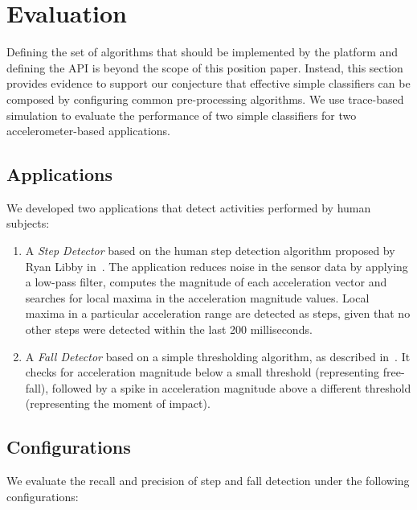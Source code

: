 \section{Evaluation}
\label{sec:validation}

Defining the set of algorithms that should be implemented by the
platform and defining the API is beyond the scope of this position
paper.  Instead, this section provides evidence to support our
conjecture that effective simple classifiers can be composed by
configuring common pre-processing algorithms.  We use trace-based
simulation to evaluate the performance of two simple classifiers for
two accelerometer-based applications.

\newpage
\subsection{Applications}

We developed two applications that detect activities performed by 
human subjects:

\begin{enumerate}
\setlength{\itemsep}{-3pt}  

\item A {\em Step Detector} based on the human step detection algorithm
  proposed by Ryan Libby in~\cite{libbyFootstepDetection}. The
  application reduces noise in the sensor data by applying a low-pass 
  filter, computes the magnitude of each acceleration vector and searches 
  for local maxima in the acceleration magnitude values. Local maxima
  in a particular acceleration range are detected as steps, given
  that no other steps were detected within the last 200 milliseconds.

\item A {\em Fall Detector} based on a simple thresholding algorithm,
  as described in~\cite{kangasFallDetection}.  It checks for acceleration magnitude 
  below a small threshold (representing free-fall), followed by a spike in acceleration magnitude 
  above a different threshold (representing the moment of impact).

\end{enumerate}

\subsection{Configurations}

We evaluate the recall and precision of step and fall detection under the following configurations:

